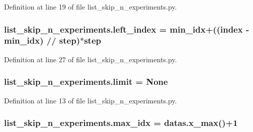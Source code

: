 Definition at line 19 of file list\+\_\+skip\+\_\+n\+\_\+experiments.\+py.

\subsubsection[{\texorpdfstring{left\+\_\+index}{left_index}}]{\setlength{\rightskip}{0pt plus 5cm}list\+\_\+skip\+\_\+n\+\_\+experiments.\+left\+\_\+index = {\bf min\+\_\+idx}+((index -\/ {\bf min\+\_\+idx}) // {\bf step})$\ast${\bf step}}\hypertarget{namespacelist__skip__n__experiments_aab171a1ef6dd6c7d8f5c64e74876f9ff}{}\label{namespacelist__skip__n__experiments_aab171a1ef6dd6c7d8f5c64e74876f9ff}


Definition at line 27 of file list\+\_\+skip\+\_\+n\+\_\+experiments.\+py.

\subsubsection[{\texorpdfstring{limit}{limit}}]{\setlength{\rightskip}{0pt plus 5cm}list\+\_\+skip\+\_\+n\+\_\+experiments.\+limit = None}\hypertarget{namespacelist__skip__n__experiments_af39c9c5347aadcd2c36c72d00e858b4b}{}\label{namespacelist__skip__n__experiments_af39c9c5347aadcd2c36c72d00e858b4b}


Definition at line 13 of file list\+\_\+skip\+\_\+n\+\_\+experiments.\+py.

\subsubsection[{\texorpdfstring{max\+\_\+idx}{max_idx}}]{\setlength{\rightskip}{0pt plus 5cm}list\+\_\+skip\+\_\+n\+\_\+experiments.\+max\+\_\+idx = datas.\+x\+\_\+max()+1}\hypertarget{namespacelist__skip__n__experiments_a9be0d16f00e062e89bbf05a8a5f2ded8}{}\label{namespacelist__skip__n__experiments_a9be0d16f00e062e89bbf05a8a5f2ded8}


